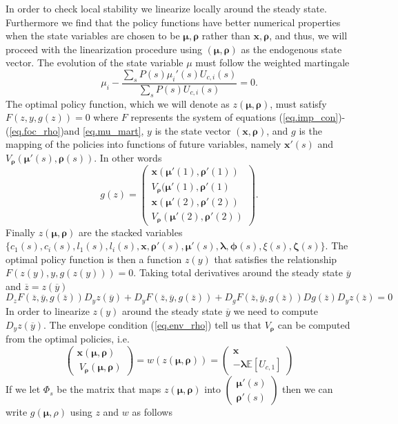 \documentclass[thmsb,11pt]{article}
\newcommand{\bmat}{\begin{matrix}}
\newcommand{\emat}{\end{matrix}}
\newcommand{\ov}{\overline}
\begin{document}
\begin{appendix}
In order to check local stability we linearize locally around the steady state. Furthermore we find that the policy functions have better numerical properties when the state variables are chosen to be $\bm \mu,\bm \rho$ rather than $\bm x,\bm \rho$, and thus, we will proceed with the linearization procedure using $(\bm \mu,\bm \rho)$ as the endogenous state vector.  The evolution of the state variable $\mu$ must follow the weighted martingale
\begin{equation}
	\mu_i - \frac{\sum_s P(s) \mu_i'(s)U_{c,i}(s)}{\sum_s P(s) U_{c,i}(s)} = 0\label{eq.mu_mart}.
\end{equation}  The optimal policy function, which we will denote as $z(\bm \mu,\bm\rho)$, must satisfy $F(z,y,g(z)) = 0$ where $F$ represents the system of equations (\ref{eq.imp_con})-(\ref{eq.foc_rho})and \eqref{eq.mu_mart}, $y$ is the state vector $(\bm x,\bm \rho)$, and $g$ is the mapping of the policies into functions of future variables, namely $\bm x'(s)$ and $V_{\bm \rho}(\bm \mu'(s),\bm \rho(s))$.  In other words
\[
	g(z) = \left(\bmat \bm x(\bm \mu'(1),\bm \rho'(1))\\ V_{\bm \rho}(\bm \mu'(1),\bm \rho'(1)\\ \bm x(\bm \mu'(2),\bm \rho'(2))\\ V_{\bm \rho}(\bm \mu'(2),\bm \rho'(2))\emat\right).
\]  Finally $z(\bm \mu,\bm \rho)$ are the stacked variables $\{c_1(s),c_i(s),l_1(s),l_i(s),\bm x,\bm \rho'(s),\bm \mu'(s),\bm \lambda,\bm \phi(s),\xi(s),\bm \zeta(s)\}$.  The optimal policy function is then a function $z(y)$ that satisfies the relationship $F(z(y),y,g(z(y))) = 0$.  Taking total derivatives around the steady state $\ov y$ and $\ov z = z(\ov y)$
\[
	D_zF(\ov z,\ov y, g(\ov z))D_yz(\ov y)+D_yF(\ov z, \ov y, g(\ov z)) + D_g F(\ov z, \ov y, g(\ov z)) D g(\ov z) D_y z(\ov z) = 0
\]  In order to linearize $z(y)$ around the steady state $\ov y$ we need to compute $D_y z(\ov y)$.   The envelope condition (\ref{eq.env_rho}) tell us that $V_{\bm \rho}$ can be computed from the optimal policies, i.e.
\[
	\left(\bmat \bm x(\bm \mu,\bm \rho)\\\ V_{\bm \rho}(\bm \mu,\bm \rho)\emat\right) = w( z(\bm \mu,\bm \rho) ) =  \left(\bmat \bm x\\ -\bm \lambda \mathbb E\left[U_{c,1}\right]\emat\right)
\]  If we let $\Phi_s$ be the matrix that maps $z(\bm \mu,\bm \rho)$ into $\left(\bmat \bm \mu'(s)\\ \bm \rho'(s)\emat\right)$ then we can write $g(\bm \mu,\rho)$ using $z$ and $w$ as follows

\end{appendix}
\end{document}
